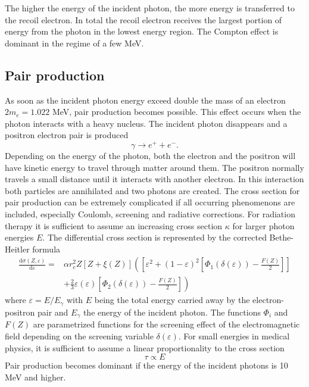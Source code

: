 The higher the energy of the incident photon, the more energy is transferred to the recoil electron. In total the recoil electron receives the largest portion of energy from the photon in the lowest energy region. The Compton effect is dominant in the regime of a few MeV.

\subsection{Pair production}
As soon as the incident photon energy exceed double the mass of an electron $2m_e = 1.022$ MeV, pair production becomes possible. This effect occurs when the photon interacts with a heavy nucleus. The incident photon disappears and a positron electron pair is produced
\begin{equation}
\gamma \rightarrow e^+ + e^-.
\end{equation}
Depending on the energy of the photon, both the electron and the positron will have kinetic energy to travel through matter around them. The positron normally travels a small distance until it interacts with another electron. In this interaction both particles are annihilated and two photons are created. The cross section for pair production can be extremely complicated if all occurring phenomenons are included, especially Coulomb, screening and radiative corrections. For radiation therapy it is sufficient to assume an increasing cross section $\kappa$ for larger photon energies $E$. The differential cross section is represented by the corrected Bethe-Heitler formula
\begin{equation}
\begin{split}
\frac{\mathrm{d}\sigma(Z,\varepsilon)}{\mathrm{d}\varepsilon} = & \alpha r_e^2 Z \left[ Z + \xi(Z) \right] \left( \left[ \varepsilon^2 + \left(1 - \varepsilon \right)^2 \left[ \Phi_1(\delta(\varepsilon)) - \frac{F(Z)}{2}\right] \right]\right.  \\
& \left.+ \frac{2}{3} \varepsilon \left(\varepsilon\right) \left[\Phi_2(\delta(\varepsilon)) - \frac{F(Z)}{2} \right] \right)
\end{split}
\end{equation}
where $\varepsilon=E/E_\gamma$ with $E$ being the total energy carried away by the electron-positron pair and $E_\gamma$ the energy of the incident photon. The functions $\Phi_i$ and $F(Z)$ are parametrized functions for the screening effect of the electromagnetic field depending on the screening variable $\delta(\varepsilon)$. For small energies in medical physics, it is sufficient to assume a linear proportionality to the cross section
\begin{equation}
\tau\propto E
\end{equation}
Pair production becomes dominant if the energy of the incident photons is 10 MeV and higher.


